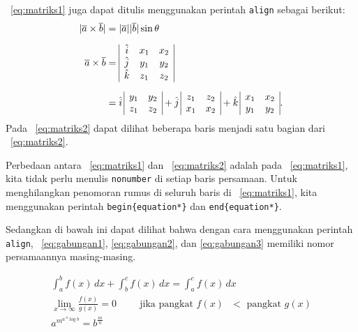 \equ~\eqref{eq:matriks1} juga dapat ditulis menggunakan  perintah \bslash \texttt{align} sebagai berikut: 
\begin{align}\label{eq:matriks2}	
	|\overline{a} \times \overline{b}| &= |\overline{a}| |\overline{b}| \sin\theta \nonumber
		\\[0.2cm]
	\overline{a} \times \overline{b} &=  
		\begin{array}{| c c c |}
			\hat{i} & x_{1} & x_{2} \\
			\hat{j} & y_{1} & y_{2} \\
			\hat{k} & z_{1} & z_{2} \\
		\end{array}  \\[0.2cm]
	&= \hat{i} \,
		\begin{array}{ | c c | }
			y_{1} & y_{2} \\
			z_{1} & z_{2} \\
		\end{array} 
	   + \hat{j} \,
		\begin{array}{ | c c | }
			z_{1} & z_{2} \\
			x_{1} & x_{2} \\
		\end{array} 
	   + \hat{k} \,	
		\begin{array}{ | c c | }
			x_{1} & x_{2} \\
			y_{1} & y_{2} \\
		\end{array}.
		\nonumber
\end{align}
Pada \equ~\eqref{eq:matriks2} dapat dilihat beberapa baris menjadi satu bagian 
dari \equ~\eqref{eq:matriks2}. 

Perbedaan antara \equ~\eqref{eq:matriks1} dan \equ~\eqref{eq:matriks2} adalah pada \equ~\eqref{eq:matriks1}, 
kita tidak perlu menulis \bslash\texttt{nonumber} di setiap baris persamaan. 
Untuk menghilangkan penomoran rumus di seluruh baris di  \equ~\eqref{eq:matriks1}, kita menggunakan perintah 
\bslash \texttt{begin\{equation*\}} dan \bslash \texttt{end\{equation*\}}.  

Sedangkan di bawah ini dapat dilihat bahwa dengan cara menggunakan perintah  \bslash \texttt{align},
 \equ~\eqref{eq:gabungan1}, \eqref{eq:gabungan2}, dan \eqref{eq:gabungan3} memiliki nomor 
persamaannya masing-masing. 

\noindent \begin{align}\label{eq:gabungan1}	
	\int_{a}^{b} f(x)\, dx + \int_{b}^{c} f(x) \, dx = \int_{a}^{c} f(x) \, dx
		\\\label{eq:gabungan2}
	\lim_{x \to \infty} \frac{f(x)}{g(x)} = 0 \hspace{1cm} 
		\text{jika pangkat $f(x)$ $<$ pangkat $g(x)$} \\\label{eq:gabungan3}
	a^{m^{a \, ^{n}\log b }} = b^{\frac{m}{n}}
\end{align}

